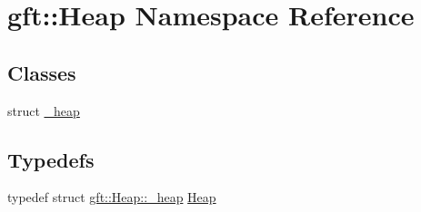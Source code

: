 \hypertarget{namespacegft_1_1Heap}{\section{gft\-:\-:Heap Namespace Reference}
\label{namespacegft_1_1Heap}
}
\subsection*{Classes}
\begin{DoxyCompactItemize}
\item 
struct \hyperlink{structgft_1_1Heap_1_1__heap}{\-\_\-heap}
\end{DoxyCompactItemize}
\subsection*{Typedefs}
\begin{DoxyCompactItemize}
\item 
typedef struct \hyperlink{structgft_1_1Heap_1_1__heap}{gft\-::\-Heap\-::\-\_\-heap} \hyperlink{namespacegft_1_1Heap_a0d90f0f86ac580f565de0c8e294ece4c}{Heap}
\end{DoxyCompactItemize}
